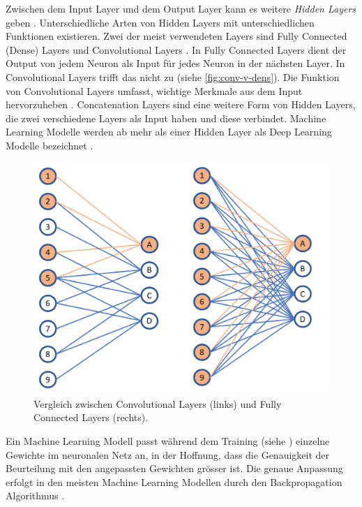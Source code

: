 Zwischen dem Input Layer und dem Output Layer kann es weitere \emph{Hidden
Layers} geben \cite{malik_what_2019}. Unterschiedliche Arten von Hidden Layers
mit unterschiedlichen Funktionen existieren. Zwei der meist verwendeten Layers
sind Fully Connected (Dense) Layers und Convolutional Layers
\cite{unzueta_convolutional_2022}. In Fully Connected Layers dient der Output
von jedem Neuron als Input für jedes Neuron in der nächsten Layer. In
Convolutional Layers trifft das nicht zu (siehe \autoref{fig:conv-v-dens}). Die
Funktion von Convolutional Layers umfasst, wichtige Merkmale aus dem Input
hervorzuheben \cite{deshpande_beginners_nodate}. Concatenation Layers
\cite{jayawardana_concatenating_2021} sind eine weitere Form von Hidden Layers,
die zwei verschiedene Layers als Input haben und diese verbindet. Machine
Learning Modelle werden ab mehr als einer Hidden Layer als Deep Learning Modelle
bezeichnet \cite{jan-dirk_kranz_deep_2019}.
 
\begin{figure}[!ht]
   \centering
   \includegraphics[width=\textwidth-4cm]{images/theorie/conv-v-dens.png}
   \caption{Vergleich zwischen Convolutional Layers (links) und Fully Connected Layers (rechts). \cite{unzueta_convolutional_2022}}\label{fig:conv-v-dens}
\end{figure}
 
Ein Machine Learning Modell passt während dem Training (siehe
) einzelne Gewichte im neuronalen Netz an, in der Hoffnung,
dass die Genauigkeit der Beurteilung mit den angepassten Gewichten grösser
ist. Die genaue Anpassung erfolgt in den meisten Machine Learning Modellen durch
den Backpropagation Algorithmus
\cite{ognjanovski_everything_2020}\cite{david_e_rumelhart_learning_nodate}.

